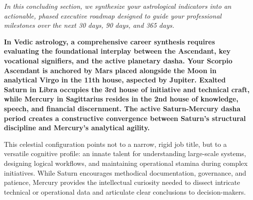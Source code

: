 


{\fontsize{9.5}{14}\selectfont\color{DeepSlate}\itshape In this concluding section, we synthesize your astrological indicators into an actionable, phased executive roadmap designed to guide your professional milestones over the next 30 days, 90 days, and 365 days.}\par\vspace{3.5mm}

\label{topic65}

{\fontsize{9.5}{13.8}\selectfont\bfseries\color{DeepSlate} In Vedic astrology, a comprehensive career synthesis requires evaluating the foundational interplay between the Ascendant, key vocational signifiers, and the active planetary dasha. Your Scorpio Ascendant is anchored by Mars placed alongside the Moon in analytical Virgo in the 11th house, aspected by Jupiter. Exalted Saturn in Libra occupies the 3rd house of initiative and technical craft, while Mercury in Sagittarius resides in the 2nd house of knowledge, speech, and financial discernment. The active Saturn-Mercury dasha period creates a constructive convergence between Saturn's structural discipline and Mercury's analytical agility.}\par\vspace{2mm}

{\fontsize{9}{13}\selectfont This celestial configuration points not to a narrow, rigid job title, but to a versatile cognitive profile: an innate talent for understanding large-scale systems, designing logical workflows, and maintaining operational stamina during complex initiatives. While Saturn encourages methodical documentation, governance, and patience, Mercury provides the intellectual curiosity needed to dissect intricate technical or operational data and articulate clear conclusions to decision-makers.}\par\vspace{1.8mm}

